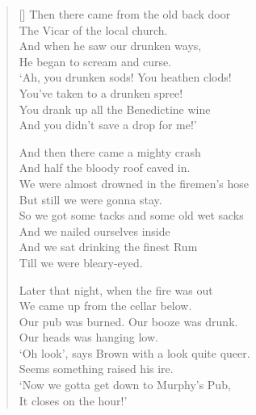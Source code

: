 \begin{verse}[\versewidth]
\clearpage
Then there came from the old back door\\
The Vicar of the local church.\\
And when he saw our drunken ways,\\
He began to scream and curse.\\
`Ah, you drunken sods! You heathen clods!\\
You've taken to a drunken spree!\\
You drank up all the Benedictine wine\\
And you didn't save a drop for me!'

And then there came a mighty crash\\
And half the bloody roof caved in.\\
We were almost drowned in the firemen's hose\\
But still we were gonna stay.\\
So we got some tacks and some old wet sacks\\
And we nailed ourselves inside\\
And we sat drinking the finest Rum\\
Till we were bleary-eyed.


Later that night, when the fire was out\\
We came up from the cellar below.\\
Our pub was burned. Our booze was drunk.\\
Our heads was hanging low.\\
`Oh look', says Brown with a look quite queer.\\
Seems something raised his ire.\\
`Now we gotta get down to Murphy's Pub,\\
It closes on the hour!'


\end{verse}
